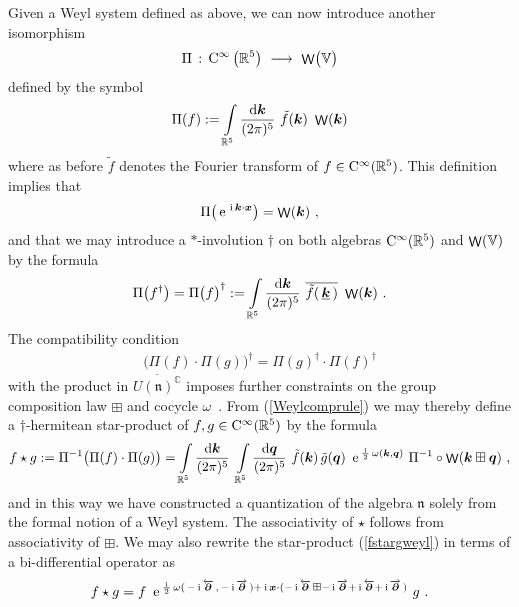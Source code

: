 \documentclass[11pt,a4paper]{article}
\DeclareMathOperator{\weyl}{{\sf W}}                   %
\newcommand{\comp}{\boxplus}                            %
\def\d{\partial}
\newcommand{\1}{\mathbb{1}}
\newcommand{\mbf}[1]{{\boldsymbol {#1} }}
\def\ii{{\,{\rm i}\,}}
\def\dd{{\rm d}}
\def\CC{{\rm C}}
\def\mx{{\mbf x}}
\def\mk{{\mbf k}}
\def\mq{{\mbf q}}
\def\mfn{{\mathfrak n}}
\def\mbbV{{\mathbb V}}
\newcommand{\complex}{{\mathbb C}} %
\newcommand{\real}{{\mathbb R}} %
\def\e{{\,\rm e}\,}
\def\d{\partial}
\newcommand{\beq}{\begin{eqnarray}}
\newcommand{\eeq}{\end{eqnarray}}
\begin{document}
Given a Weyl system defined as above, we can now introduce
another isomorphism
\beq
\Pi\,:\,\CC^\infty\left(\real^5\right)~\longrightarrow~
\weyl\bigl(\mathbb{V}\bigr)
\label{Omegaquantmap}\eeq
defined by the symbol
\beq
\Pi(f):=\int\limits_{\real^5}\frac{\dd\mk}{(2\pi)^5}~
\tilde{f}(\mk)~\weyl(\mk)
\label{Omegafdef}\eeq
where as before $\tilde f$ denotes the Fourier transform of
$f\in\CC^\infty(\real^5)$. This definition implies that
\beq
\Pi\bigl(\e^{\ii\mk\cdot\mx}\bigr)=\weyl(\mk) \ ,
\label{weylmkDelta}\eeq
and that we may introduce a $*$-involution $\dag$ on both algebras
$\CC^\infty(\real^5)$ and $\weyl(\mbbV)$ by the formula
\beq
\Pi\bigl(f^\dag\bigr)=\Pi\bigl(f\bigr)^\dag:=
\int\limits_{\real^5}\frac{\dd\mk}{(2\pi)^5}~\overline{
\tilde f(\,\underline{\mk}\,)}~\weyl(\mk) \ .
\label{involdef}\eeq
The compatibility condition
\beq
\bigl(\Pi(f)\cdot\Pi(g)\bigr)^\dag=\Pi(g)^\dag\cdot
\Pi(f)^\dag
\label{compconddag}\eeq
with the product in $\overline{U(\mfn)^\complex}$ imposes further
constraints on the group composition law $\comp$ and cocycle
$\omega$~\cite{ALZ1}. From (\ref{Weylcomprule}) we may thereby define
a $\dag$-hermitean star-product of $f,g\in\CC^\infty(\real^5)$ by the
formula
\beq
f\star g:=\Pi^{-1}\bigl(\Pi(f)\cdot\Pi(g)\bigr)
=\int\limits_{\real^5}\frac{\dd\mk}{(2\pi)^5}~
\int\limits_{\real^5}\frac{\dd\mq}{(2\pi)^5}~\tilde f(\mk)\,
\tilde g(\mq)~\e^{\frac\ii2\,\omega(\mk,\mq)}~
\Pi^{-1}\circ\weyl(\mk\comp\mq) \ ,
\label{fstargweyl}\eeq
and in this way we have constructed a quantization of the
algebra $\mfn$ solely from the formal notion of a Weyl system.
The associativity of $\star$ follows from associativity of
$\comp$. We may also rewrite the star-product (\ref{fstargweyl}) in
terms of a bi-differential operator as
\beq
f\star g=f~\e^{\frac\ii2\,\omega(\,-\ii\overleftarrow{\mbf\d}\,,\,
-\ii\overrightarrow{\mbf\d}\,)+\ii\mx\cdot(-\ii\overleftarrow{\mbf\d}\,\comp
-\ii\overrightarrow{\mbf\d}+\ii\overleftarrow{\mbf\d}+\ii
\overrightarrow{\mbf\d}\,)}~g \ .
\label{bidiffweyl}\eeq
\end{document}
